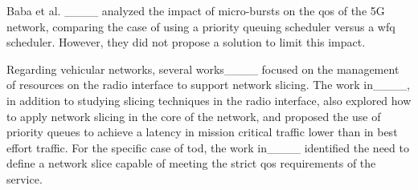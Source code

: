 Baba et al. ____ analyzed the impact of micro-bursts on the \gls{qos} of the 5G network, comparing the case of using a priority queuing scheduler versus a \gls{wfq} scheduler. However, they did not propose a solution to limit this impact.

Regarding vehicular networks, several works____ focused on the management of resources on the radio interface to support network slicing. The work in____, in addition to studying slicing techniques in the radio interface, also explored how to apply network slicing in the core of the network, and proposed the use of priority queues to achieve a latency in mission critical traffic lower than in best effort traffic. For the specific case of \gls{tod}, the work in____ identified the need to define a network slice capable of meeting the strict \gls{qos} requirements of the service. 

